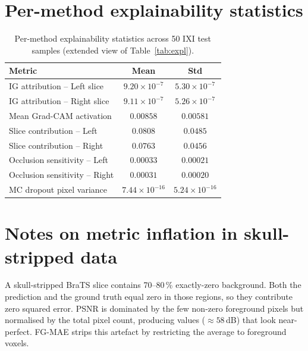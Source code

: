 \documentclass[10pt,a4paper]{article}
\begin{document}
\section{Per-method explainability statistics}
\label{app:expl}
\begin{table}[h]
    \centering
    \footnotesize
    \begin{tabular}{lcc}
        \toprule
        Metric                                & Mean                            & Std \\
        \midrule
        IG attribution -- Left slice          & $9.20\!\times\!10^{-7}$         & $5.30\!\times\!10^{-7}$ \\
        IG attribution -- Right slice         & $9.11\!\times\!10^{-7}$         & $5.26\!\times\!10^{-7}$ \\
        Mean Grad-CAM activation              & $0.00858$                       & $0.00581$ \\
        Slice contribution -- Left            & $0.0808$                        & $0.0485$ \\
        Slice contribution -- Right           & $0.0763$                        & $0.0456$ \\
        Occlusion sensitivity -- Left         & $0.00033$                       & $0.00021$ \\
        Occlusion sensitivity -- Right        & $0.00031$                       & $0.00020$ \\
        MC dropout pixel variance             & $7.44\!\times\!10^{-16}$        & $5.24\!\times\!10^{-16}$ \\
        \bottomrule
    \end{tabular}
    \caption{Per-method explainability statistics across 50 IXI test
    samples (extended view of Table~\ref{tab:expl}).}
\end{table}

\section{Notes on metric inflation in skull-stripped data}
\label{app:fgmae}
A skull-stripped BraTS slice contains 70--80\,\% exactly-zero background.
Both the prediction and the ground truth equal zero in those regions, so
they contribute zero squared error. PSNR is dominated by the few non-zero
foreground pixels but normalised by the total pixel count, producing values
($\approx 58$\,dB) that look near-perfect. FG-MAE strips this artefact by
restricting the average to foreground voxels.
\end{document}
